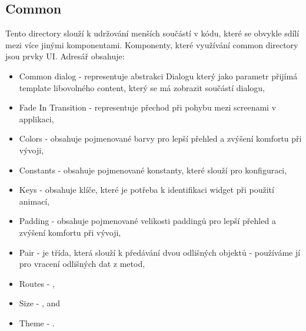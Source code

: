\subsection{Common}\label{subsec:common}
Tento directory slouží k udržování menších součástí v kódu, které se obvykle sdílí mezi více jinými komponentami.
Komponenty, které využívání common directory jsou prvky UI.
Adresář obsahuje:
\begin{itemize}
    \item Common dialog - representuje abstrakci Dialogu který jako parametr přijímá template libovolného content, který se má zobrazit součástí dialogu,
    \item Fade In Transition - representuje přechod při pohybu mezi screenami v applikaci,
    \item Colors - obsahuje pojmenované barvy pro lepší přehled a zvýšení komfortu při vývoji,
    \item Constants - obsahuje pojmenované konstanty, které slouží pro konfiguraci,
    \item Keys - obsahuje klíče, které je potřeba k identifikaci widget při použití animací,
    \item Padding - obsahuje pojmenované velikosti paddingů pro lepší přehled a zvýšení komfortu při vývoji,
    \item Pair - je třída, která slouží k předávání dvou odlišných objektů - používáme jí pro vracení odlišných dat z metod,
    \item Routes - ,
    \item Size - , and
    \item Theme - .
\end{itemize}
